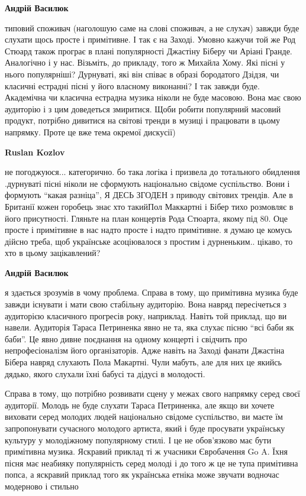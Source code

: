 \begin{itemize}
\begin{itemize}
\textbf{Андрій Василюк} 

типовий споживач (наголошую саме на слові споживач, а не слухач) завжди буде
слухати щось просте і примітивне. І так є на Заході. Умовно кажучи той же Род
Стюард також програє в плані популярності Джастіну Біберу чи Аріані Гранде.
Аналогічно і у нас. Візьміть, до прикладу, того ж Михайла Хому. Які пісні у
нього популярніші? Дурнуваті, які він співає в образі бородатого Дзідзя, чи
класичні естрадні пісні у його власному виконанні? І так завжди буде.
Академічна чи класична естрадна музика ніколи не буде масовою. Вона має свою
аудиторію і з цим доведеться змиритися. Щоби робити популярний масовий продукт,
потрібно дивитися на світові тренди в музиці і працювати в цьому напрямку.
Проте це вже тема окремої дискусії)

\textbf{Ruslan Kozlov} 

не погоджуюся... категорично. бо така логіка і призвела до тотального обидлення
.дурнуваті пісні ніколи не сформують національно свідоме суспільство. Вони і
формують \enquote{какая разніца}, Я ДЕСЬ ЗГОДЕН з приводу світових трендів. Але в
Британії кожен горобець знає хто такийПол Маккартні і Бібер тихо розмовляє в
його присутності. Гляньте на план концертів Рода Стюарта, якому під 80. Оце
просте і примітивне в нас надто просте і надто примітивне. я думаю це комусь
дійсно треба, щоб українське асоціювалося з простим і дурненьким.. цікаво, то
хто в цьому зацікавлений?


\textbf{Андрій Василюк} 

я здається зрозумів в чому проблема. Справа в тому, що примітивна музика буде
завжди існувати і мати свою стабільну аудиторію. Вона навряд пересічеться з
аудиторією класичного прогресів року, наприклад. Навіть той приклад, що ви
навели. Аудиторія Тараса Петриненка явно не та, яка слухає пісню \enquote{всі баби як
баби}. Це явно дивне поєднання на одному концерті і свідчить про
непрофесіоналізм його організаторів. Адже навіть на Заході фанати Джастіна
Бібера навряд слухають Пола Макартні. Чули мабуть, але для них це якийсь
дядько, якого слухали їхні бабусі та дідусі в молодості.

Справа в тому, що потрібно розвивати сцену у межах свого напрямку серед своєї
аудиторії. Молодь не буде слухати Тараса Петриненка, але якщо ви хочете
виховати серед молодих людей національно свідоме суспільство, ви маєте їм
запропонувати сучасного молодого артиста, який і буде просувати українську
культуру у молодіжному популярному стилі. І це не обов'язково має бути
примітивна музика. Яскравий приклад ті ж учасники Євробачення Go A. Їхня пісня
має неабияку популярність серед молоді і до того ж це не тупа примітивна попса,
а яскравий приклад того як українська етніка може звучати водночас модерново і
стильно


\end{itemize}
\end{itemize}
